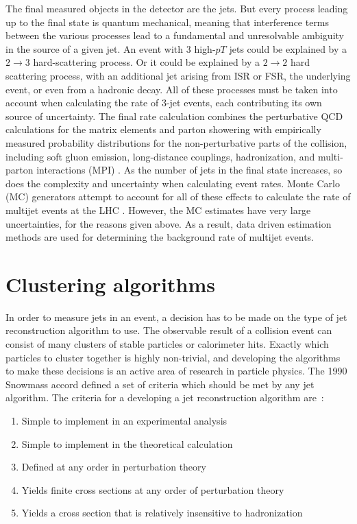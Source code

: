 The final measured objects in the detector are the jets.
But every process leading up to the final state is quantum mechanical,
meaning that interference terms between the various processes lead to a fundamental and unresolvable ambiguity in the source of a given jet.
An event with 3 high-$pT$ jets could be explained by a $2\rightarrow3$ hard-scattering process.
Or it could be explained by a $2\rightarrow2$ hard scattering process, with an additional jet arising from ISR or FSR, the underlying event, or even from a hadronic decay.
All of these processes must be taken into account when calculating the rate of 3-jet events, each contributing its own source of uncertainty.
The final rate calculation combines the perturbative QCD calculations for the matrix elements and parton showering with empirically measured probability distributions for the non-perturbative parts of the collision, including soft gluon emission, long-distance couplings, hadronization, and multi-parton interactions (MPI) .
As the number of jets in the final state increases, so does the complexity and uncertainty when calculating event rates.
Monte Carlo (MC) generators attempt to account for all of these effects to calculate the rate of multijet events at the LHC .
However, the MC estimates have very large uncertainties, for the reasons given above.
As a result, data driven estimation methods are used for determining the background rate of multijet events.

\section{Clustering algorithms}\label{sec:jet_clustering}

In order to measure jets in an event, a decision has to be made on the type of jet reconstruction algorithm to use.
The observable result of a collision event can consist of many clusters of stable particles or calorimeter hits.
Exactly which particles to cluster together is highly non-trivial, and developing the algorithms to make these decisions is an active area of research in particle physics.
The 1990 Snowmass accord defined a set of criteria which should be met by any jet algorithm.
The criteria for a developing a jet reconstruction algorithm are~\cite{jet-jetography,jet-snowmass}:

\begin{enumerate}
    \item Simple to implement in an experimental analysis
    \item Simple to implement in the theoretical calculation
    \item Defined at any order in perturbation theory
    \item Yields finite cross sections at any order of perturbation theory
    \item Yields a cross section that is relatively insensitive to hadronization
\end{enumerate}

